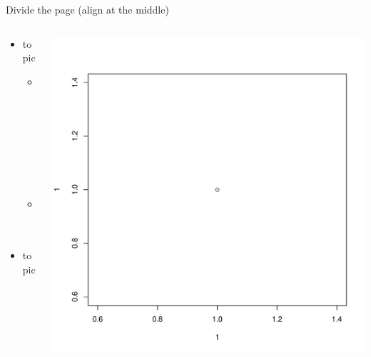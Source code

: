 \documentclass[table]{beamer}
\begin{document}
\begin{frame}[label={sec:orgd22d274}]{Divide the page (align at the middle)}
\begin{columns}
\begin{column}{0.45\columnwidth}
\begin{itemize}
\item topic
\begin{itemize}
\item subtopic
\item sub
\end{itemize}
\item topic
\end{itemize}
\end{column}

\begin{column}{0.45\columnwidth}
\begin{center}
\includegraphics[width=.9\linewidth]{./figures/myplot.pdf}
\end{center}
\end{column}
\end{columns}
\end{frame}
\end{document}
